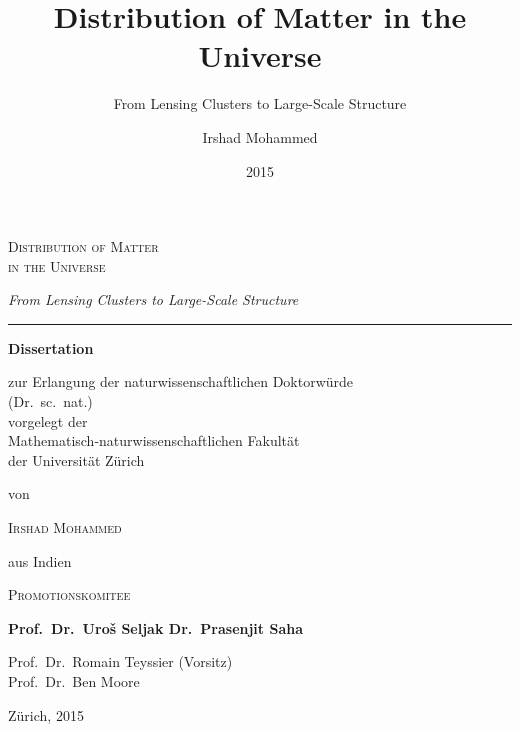 \documentclass[
  11pt,
  twoside,
  openright,
  titlepage,
  headings=optiontoheadandtoc
]{scrbook}
\title{Distribution of Matter in the Universe}
\subtitle{From Lensing Clusters to Large-Scale Structure}
\author{Irshad Mohammed}
\date{2015}
\begin{document}
\frontmatter

\begin{titlepage}
  \thispagestyle{empty}
  \centering

  \vspace*{0.055\textheight}

  {\fontsize{22}{27}\selectfont
   \scshape
   Distribution of Matter\\
   in the Universe\par}

  \vspace{0.8em}

  {\fontsize{13}{17}\selectfont
   \itshape
   From Lensing Clusters to Large-Scale Structure\par}

  \vspace{1.6em}
  {\color{black!55}\rule{0.42\textwidth}{0.5pt}\par}

  \vfill

  {\large\bfseries Dissertation\par}

  \vspace{0.9em}

  {\small
   zur Erlangung der naturwissenschaftlichen Doktorw\"urde\\
   (Dr.~sc.~nat.)\\[0.75em]
   vorgelegt der\\
   Mathematisch-naturwissenschaftlichen Fakult\"at\\
   der Universit\"at Z\"urich\par}

  \vspace{1.5em}

  {\small von\par}
  \vspace{0.45em}
  {\Large\scshape Irshad Mohammed\par}
  \vspace{0.35em}
  {\small aus Indien\par}

  \vfill

  \begin{minipage}{0.76\textwidth}
    \centering
    {\small\scshape Promotionskomitee\par}
    \vspace{0.65em}
    {\normalsize\bfseries
     Prof.~Dr.~Uro\v{s} Seljak
     \quad\textperiodcentered\quad
     Dr.~Prasenjit Saha\par}
    \vspace{0.65em}
    {\small
     Prof.~Dr.~Romain Teyssier (Vorsitz)\\
     Prof.~Dr.~Ben Moore\par}
  \end{minipage}

  \vfill

  {\small Z\"urich, 2015\par}

  \vspace*{0.025\textheight}
\end{titlepage}
\end{document}
